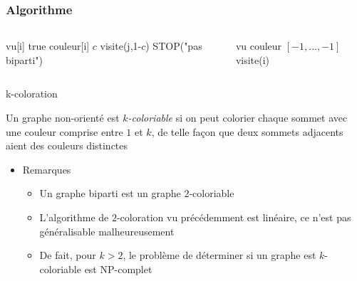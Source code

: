     \begin{frame}[fragile]
        \frametitle{Algorithme}
            \begin{columns}
                \begin{column}{.55\textwidth}
                    \begin{algorithmic}
                    \State vu[i] \gets true
                    \State couleur[i] \gets $c$
                            \State visite(j,1-$c$)
                                \State STOP("pas biparti")
                        \EndIf
                    \EndFor
                    \EndFunction
                                    \end{algorithmic}
                \end{column}
                \begin{column}{.45\textwidth}
                    \begin{algorithmic}
                        \State vu 
                        \State couleur \gets $[-1,...,-1]$
                                \State visite(i)
                            \EndIf
                        \EndFor
                    \end{algorithmic}            
                \end{column}
            \end{columns}    
        \end{frame}
        
\begin{frame}{k-coloration}
\begin{definition}
    Un graphe non-orienté est \emph{$k$-coloriable} si on peut colorier chaque sommet avec une couleur comprise entre $1$ et $k$, de telle façon que deux sommets adjacents aient des couleurs distinctes
\end{definition}
\begin{itemize}
    \item Remarques 
    \begin{itemize}
        \item Un graphe biparti est un graphe $2$-coloriable 
        \item L'algorithme de $2$-coloration vu précédemment est linéaire, ce n'est pas généralisable malheureusement
        \item De fait, pour $k>2$, le problème de déterminer si un graphe est $k$-coloriable est NP-complet  
    \end{itemize}
\end{itemize}
\end{frame}

